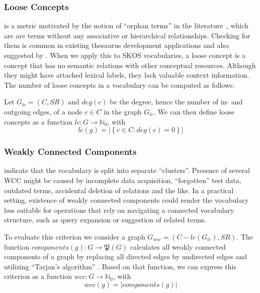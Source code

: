 \subsubsection{Loose Concepts} is a metric motivated by the notion of ``orphan terms'' in the literature~\cite{Hedden2010}, which are are terms without any associative or hierarchical relationships. Checking for them is common in existing thesaurus development applications and also suggested by \cite{Z39.19:2005}. When we apply this to SKOS vocabularies, a loose concept is a concept that has no semantic relations with other conceptual resources. Although they might have attached lexical labels, they lack valuable context information. The number of loose concepts in a vocabulary can be computed as follows:

\begin{definition}
Let \(G_{lc} = (C, SR)\) and \(deg(c)\) be the degree, hence the number of in- and outgoing edges, of a node $c \in C$ in the graph $G_{lc}$. We can then define loose concepts as a function \(lc : G \rightarrow \mathbb{N}_{0}\), with \[lc(g) = \left|\left\{c \in C : deg(c) = 0\right\}\right|\]

\end{definition}

\subsubsection{Weakly Connected Components} indicate that the vocabulary is split into separate ``clusters''. Presence of several WCC might be caused by incomplete data acquisition, ``forgotten'' test data, outdated terms, accidental deletion of relations and the like. In a practical setting, existence of weakly connected components could render the vocabulary less suitable for operations that rely on navigating a connected vocabulary structure, such as query expansion or suggestion of related terms.
 
\begin{definition}
To evaluate this criterion we consider a graph \(G_{wcc} = (C - lc(G_{lc}), SR)\). The function \(components(g) : G \rightarrow  \mathfrak{P}(G)\) calculates all weakly connected components of a graph by replacing all directed edges by undirected edges and utilizing “Tarjan’s algorithm” \cite{Hopcroft1973}. Based on that function, we can express this criterion as a function \(wcc : G \rightarrow \mathbb{N}_{0}\), with \[wcc(g) = \left|components(g)\right|\]
\end{definition}
 
